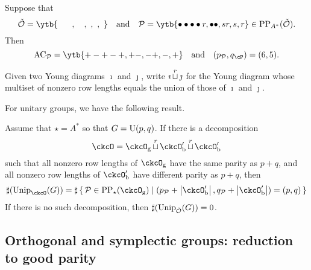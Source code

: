 \documentclass[counting_main.tex]{subfiles}
\begin{document}
\begin{eg}
 Suppose that \[
\check \CO=\ytb{\ \ \ \ \ , \ \ \ , \ , \ , \   }\quad \textrm{and}\quad  \CP=\ytb{\bullet\bullet\bullet\bullet r,\bullet\bullet , sr,s,r}\in \mathrm{PP}_{A^*}(\check \CO) .
 \]
 Then
 \[
  \mathrm{AC}_\CP=
 \ytb{+-+-+,+-, -+,-,+}\quad \textrm{and}  \quad  (p_\CP, q_\cP)=(6,5).
  \]
\end{eg}

Given two Young diagrams $\imath$ and $\jmath$, write $\imath{\,\stackrel{r}{\sqcup}\,} \jmath$ for
the Young diagram whose multiset of nonzero row lengths equals the union of
those of $\imath$ and $\jmath$.

For unitary groups, we have the following result.
\begin{thm}
  Assume that $\star=A^*$ so that $G=\operatorname{U}(p,q)$. If there is a decomposition
  \[
    \ckcO=\ckcOg \cuprow \ckcOpb \cuprow \ckcOpb
  \]
  such that all nonzero row lengths of $\ckcOg$ have the same
  parity as $p+q$, and all nonzero row lengths of $\ckcOpb$ have
  different parity as $p+q$, then
  \[
    \sharp(\Unip_{\ckcO}(G))= \sharp \set{\CP\in \mathrm{PP}_\star(\ckcOg)|(p_\CP+\abs{\ckcOpb}, q_\CP+\abs{\ckcOpb})=(p,q)}
  \]
  If there is no such decomposition, then $\sharp(\mathrm{Unip}_{\check {{\mathcal {O}}}}(G))=0$.

\end{thm}

\subsection{Orthogonal and symplectic groups: reduction to good parity}
\end{document}
